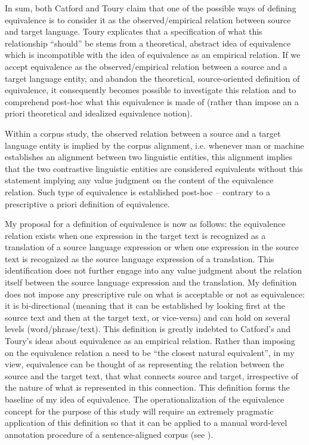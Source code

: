 In sum, both Catford and Toury claim that one of the possible ways of defining equivalence is to consider it as the observed\slash empirical relation between source and target language. Toury explicates that a specification of what this relationship ``should'' be stems from a theoretical, abstract idea of equivalence which is incompatible with the idea of equivalence as an empirical relation. If we accept equivalence as the observed\slash empirical relation between a source and a target language entity, and abandon the theoretical, source-oriented definition of equivalence, it consequently becomes possible to investigate this relation and to comprehend post-hoc what this equivalence is made of (rather than impose an a priori theoretical and idealized equivalence notion).

Within a corpus study, the observed relation between a source and a target language entity is implied by the corpus alignment, i.e. whenever man or machine establishes an alignment between two linguistic entities, this alignment implies that the two contrastive linguistic entities are considered equivalents without this statement implying any value judgment on the content of the equivalence relation. Such type of equivalence is established post-hoc \textit{–} contrary to a prescriptive a priori definition of equivalence.

My proposal for a definition of equivalence is now as follows: the equivalence relation exists when one expression in the target text is recognized as a translation of a source language expression or when one expression in the source text is recognized as the source language expression of a translation. This identification does not further engage into any value judgment about the relation itself between the source language expression and the translation. My definition does not impose any prescriptive rule on what is acceptable or not as equivalence: it is bi-directional (meaning that it can be established by looking first at the source text and then at the target text, or vice-versa) and can hold on several levels (word\slash phrase/text). This definition is greatly indebted to Catford’s and Toury’s ideas about equivalence as an empirical relation. Rather than imposing on the equivalence relation a need to be “the closest natural equivalent”, in my view, equivalence can be thought of as representing the relation between the source and the target text, that what connects source and target, irrespective of the nature of what is represented in this connection. This definition forms the baseline of my idea of equivalence. The operationalization of the equivalence concept for the purpose of this study will require an extremely pragmatic application of this definition so that it can be applied to a manual word-level annotation procedure of a sentence-aligned corpus (see ).

